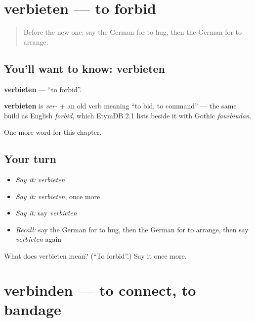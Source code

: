 \section[verbieten]{verbieten — to forbid}

\label{lesson:GE-C189-verbieten}



\begin{quote}
Before the new one: say the German for to hug, then the German for to arrange.
\end{quote}

\subsection*{You'll want to know: verbieten}
\textbf{verbieten} — \textquotedblleft{}to forbid\textquotedblright{}.

\begin{cousinweb}
\textbf{verbieten} is \emph{ver-} + an old verb meaning \textquotedblleft{}to bid, to command\textquotedblright{} — the same build as English \emph{forbid}, which EtymDB 2.1 lists beside it with Gothic \emph{faurbiudan}.
\end{cousinweb}

\begin{grammarlens}[title={What you've built}]
One more word for this chapter.
\end{grammarlens}

\subsection*{Your turn}
\begin{itemize}
\raggedright
  \item \emph{Say it:} \emph{verbieten}
  \item \emph{Say it:} \emph{verbieten}, once more
  \item \emph{Say it:} say \emph{verbieten}
  \item \emph{Recall:} say the German for to hug, then the German for to arrange, then say \emph{verbieten} again
\end{itemize}

\begin{tcolorbox}[breakable,colback=teal!4,colframe=teal!35!black,title={Before you move on}]
What does verbieten mean? (\textquotedblleft{}To forbid\textquotedblright{}.) Say it once more.
\end{tcolorbox}
\section[verbinden]{verbinden — to connect, to bandage}

